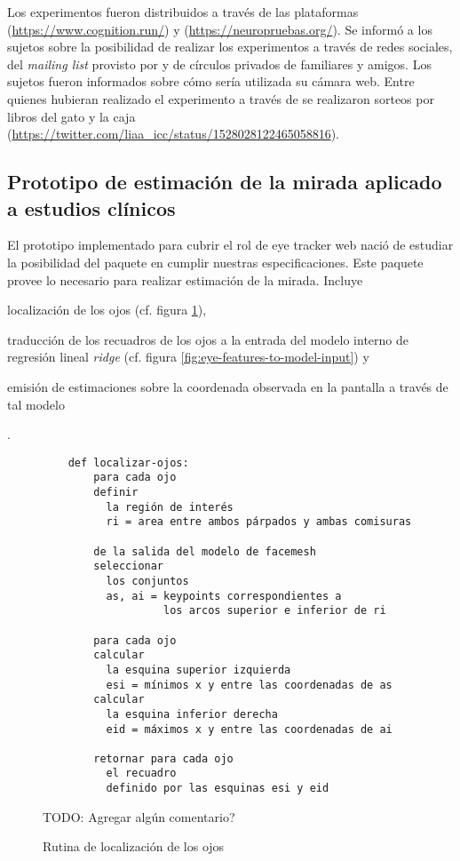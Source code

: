   Los experimentos fueron distribuidos a través de las plataformas \cognition
  (\url{https://www.cognition.run/}) y \neuropruebas
  (\url{https://neuropruebas.org/}).
  Se informó a los sujetos sobre la posibilidad de realizar los experimentos a
  través de redes sociales, del \textit{mailing list} provisto por \neuropruebas
  y de círculos privados de familiares y amigos.
  Los sujetos fueron informados sobre cómo sería utilizada su cámara web.
  Entre quienes hubieran realizado el experimento a través de \neuropruebas se 
  realizaron sorteos por libros del gato y la caja
  (\url{https://twitter.com/liaa_icc/status/1528028122465058816}).

\subsection{Prototipo de estimación de la mirada aplicado a estudios clínicos}

  El prototipo implementado para cubrir el rol de eye tracker web nació de
  estudiar la posibilidad del paquete \webgazer en cumplir nuestras
  especificaciones.
  Este paquete provee lo necesario para realizar estimación de la mirada.
  Incluye \begin{enumerate*}
    \item localización de los ojos (cf. figura \ref{fig:eyes-localization}),
    \item traducción de los recuadros de los ojos a la entrada del modelo interno
      de regresión lineal \textit{ridge} (cf. figura
      \ref{fig:eye-features-to-model-input}) y
    \item emisión de estimaciones sobre la coordenada observada en la pantalla a
      través de tal modelo
  \end{enumerate*}.

  \begin{figure}
    \begin{verbatim}
    def localizar-ojos:
        para cada ojo
        definir
          la región de interés
          ri = area entre ambos párpados y ambas comisuras
        
        de la salida del modelo de facemesh
        seleccionar
          los conjuntos
          as, ai = keypoints correspondientes a
                   los arcos superior e inferior de ri
        
        para cada ojo
        calcular
          la esquina superior izquierda
          esi = mínimos x y entre las coordenadas de as
        calcular
          la esquina inferior derecha
          eid = máximos x y entre las coordenadas de ai
      
        retornar para cada ojo
          el recuadro
          definido por las esquinas esi y eid
    \end{verbatim}
    TODO: Agregar algún comentario?
    \caption{Rutina de localización de los ojos}
    \label{fig:eyes-localization}
  \end{figure}


